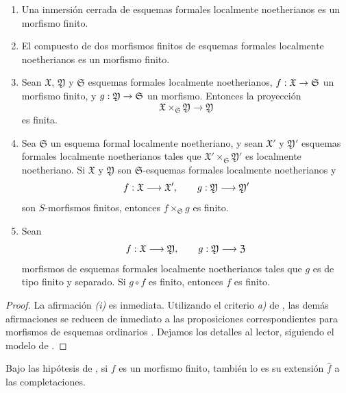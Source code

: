 \documentclass[oneside]{amsart}
\makeatletter
\newcommand{\ega@arrow}[2]{\mathchoice{#1}{#2}{#2}{#2}}
\renewcommand{\to}{\ega@arrow{\longrightarrow}{\rightarrow}}
\let\EGAOriginalLabel\label
\renewcommand{\label}[1]{\phantomsection\EGAOriginalLabel{#1}}
\makeatother
\begin{document}
\begin{proposition}[4.8.3]
\label{III.4.8.3}
\begin{enumerate}
  \item[\rm{(i)}] Una inmersión cerrada de esquemas formales localmente
    noetherianos es un morfismo finito.
  \item[\rm{(ii)}] El compuesto de dos morfismos finitos de esquemas formales
    localmente noetherianos es un morfismo finito.
  \item[\rm{(iii)}] Sean $\mathfrak{X}$, $\mathfrak{Y}$ y
    $\mathfrak{S}$ esquemas formales localmente noetherianos,
    $f:\mathfrak{X}\to\mathfrak{S}$ un morfismo finito, y
    $g:\mathfrak{Y}\to\mathfrak{S}$ un morfismo. Entonces la proyección
    \[
      \mathfrak{X}\times_{\mathfrak{S}}\mathfrak{Y}
      \longrightarrow\mathfrak{Y}
    \]
    es finita.
  \item[\rm{(iv)}] Sea $\mathfrak{S}$ un esquema formal localmente
    noetheriano, y sean $\mathfrak{X}'$ y $\mathfrak{Y}'$
    esquemas formales localmente noetherianos tales que
    $\mathfrak{X}'\times_{\mathfrak{S}}\mathfrak{Y}'$ es localmente
    noetheriano. Si $\mathfrak{X}$ y $\mathfrak{Y}$ son
    $\mathfrak{S}$-esquemas formales localmente noetherianos y
    \[
      f:\mathfrak{X}\to\mathfrak{X}',\qquad
      g:\mathfrak{Y}\to\mathfrak{Y}'
    \]
    son $S$-morfismos finitos, entonces
    $f\times_{\mathfrak{S}}g$ es finito.
  \item[\rm{(v)}] Sean
    \[
      f:\mathfrak{X}\to\mathfrak{Y},\qquad
      g:\mathfrak{Y}\to\mathfrak{Z}
    \]
    morfismos de esquemas formales localmente noetherianos tales que
    $g$ es de tipo finito y separado. Si $g\circ f$ es finito,
    entonces $f$ es finito.
\end{enumerate}
\end{proposition}

\begin{proof}
La afirmación \emph{(i)} es inmediata. Utilizando el criterio \emph{a)} de
, las demás afirmaciones se reducen de inmediato a las
proposiciones correspondientes para morfismos de esquemas ordinarios
. Dejamos los detalles al lector, siguiendo
el modelo de .
\end{proof}

\begin{corollary}[4.8.4]
\label{III.4.8.4}
Bajo las hipótesis de , si $f$ es un morfismo
finito, también lo es su extensión $\widehat{f}$ a las
completaciones.
\end{corollary}
\end{document}
